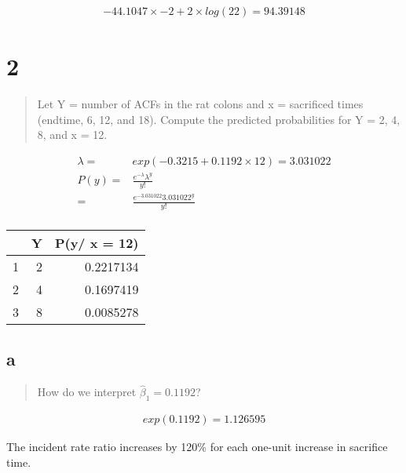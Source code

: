 \documentclass[11pt]{article}
\begin{document}
\begin{equation}
\begin{split}
-44.1047 \times -2 + 2 \times log(22) = 94.39148
\end{split}
\end{equation}
\section{2}
\label{sec:orgb410f77}
\begin{quote}
Let Y = number of ACFs in the rat colons and x = sacrificed times (endtime, 6,
12, and 18). Compute the predicted probabilities for Y = 2, 4, 8, and x = 12.
\end{quote}


\begin{equation}
\begin{split}
\lambda = & exp(-0.3215 + 0.1192 \times 12) = 3.031022\\
P(y) = & \frac{e^{- \lambda} \lambda^y}{y!}\\
= & \frac{e^{- 3.031022} 3.031022^y}{y!}\\
\end{split}
\end{equation}

\begin{center}
\begin{tabular}{rrr}
 & Y & P(y/ x = 12)\\
\hline
1 & 2 & 0.2217134\\
2 & 4 & 0.1697419\\
3 & 8 & 0.0085278\\
\end{tabular}
\end{center}
\subsection{a}
\label{sec:org99d1a83}
\begin{quote}
How do we interpret \(\hat \beta_1 = 0.1192\)?
\end{quote}

\begin{equation}
\begin{split}
exp(0.1192) = 1.126595
\end{split}
\end{equation}

The incident rate ratio increases by 120\% for each one-unit increase in
sacrifice time.
\end{document}
